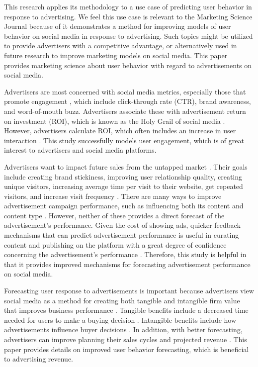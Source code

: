 \documentclass{article}
\begin{document}
This research applies its methodology to a use case of predicting user behavior in response to advertising. We feel this use case is relevant to the Marketing Science Journal because of it demonstrates a method for improving models of user behavior on social media in response to advertising. Such topics might be utilized to provide advertisers with a competitive advantage, or alternatively used in future research to improve marketing models on social media. This paper provides marketing science about user behavior with regard to advertisements on social media.

Advertisers are most concerned with social media metrics, especially those that promote engagement \cite{Tiago2014}, which include click-through rate (CTR), brand awareness, and word-of-mouth buzz. Advertisers associate these with advertisement return on investment (ROI), which is known as the Holy Grail of social media \cite{Fisher2009}. However, advertisers calculate ROI, which often includes an increase in user interaction \cite{Romero2011, Schacht2015}. This study successfully models user engagement, which is of great interest to advertisers and social media platforms.  

Advertisers want to impact future sales from the untapped market \cite{Guo2020}. Their goals include creating brand stickiness, improving user relationship quality, creating unique visitors, increasing average time per visit to their website, get repeated visitors, and increase visit frequency \cite{Bhat2002}. There are many ways to improve advertisement campaign performance, such as influencing both its content and content type \cite{Imsa2020}. However, neither of these provides a direct forecast of the advertisement's performance. Given the cost of showing ads, quicker feedback mechanisms that can predict advertisement performance is useful in curating content and publishing on the platform with a great degree of confidence concerning the advertisement's performance \cite{Hu2016}. Therefore, this study is helpful in that it provides improved mechanisms for forecasting advertisement performance on social media.

Forecasting user response to advertisements is important because advertisers view social media as a method for creating both tangible and intangible firm value that improves business performance \cite{Authors2013}. Tangible benefits include a decreased time needed for users to make a buying decision \cite{Authors2013}. Intangible benefits include how advertisements influence buyer decisions \cite{Authors2013}. In addition, with better forecasting, advertisers can improve planning their sales cycles and projected revenue \cite{Imsa2020}. This paper provides details on improved user behavior forecasting, which is beneficial to advertising revenue. 
\end{document}
